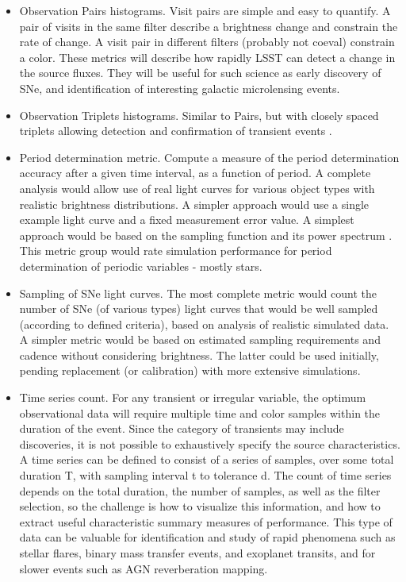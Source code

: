 \begin{itemize}

\item Observation Pairs histograms.  Visit pairs are simple and easy to
quantify.  A pair of visits in the same filter describe a brightness
change and constrain the rate of change. A visit pair in different
filters (probably not coeval) constrain a color.  These metrics will
describe how rapidly LSST can detect a change in the source fluxes. They
will be useful for such science as early discovery of SNe, and
identification of interesting galactic microlensing events.

\item Observation Triplets histograms. Similar to Pairs, but with
closely spaced triplets allowing detection and confirmation of transient
events \citep[as described by][]{LundEtal2016}.

\item Period determination metric.  Compute a measure of the period
determination accuracy after a given time interval, as a function of
period. A complete analysis would allow use of real light curves for
various object types with realistic brightness distributions.  A simpler
approach would use a single example light curve and a fixed measurement
error value. A simplest approach would be based on the sampling function
and its power spectrum \citep{LundEtal2016}.  This metric group would
rate simulation performance for period determination of periodic
variables - mostly stars.

\item Sampling of SNe light curves.  The most complete metric would
count the number of SNe (of various types) light curves that would be
well sampled (according to defined criteria), based on analysis of
realistic simulated data.  A simpler metric would be based on estimated
sampling requirements and cadence without considering brightness. The
latter could be used initially, pending replacement (or calibration)
with more extensive simulations.

\item Time series count. For any transient or irregular variable, the
optimum observational data will require multiple time and color samples
within the duration of the event. Since the category of transients may
include discoveries, it is not possible to exhaustively specify the
source characteristics. A time series can be defined to consist of a
series of samples, over some total duration T, with sampling interval t
to tolerance d. The count of time series depends on the total duration,
the number of samples, as well as the filter selection, so the challenge
is how to visualize this information, and how to extract useful
characteristic summary measures of performance.  This type of data can
be valuable for identification and study of rapid phenomena such as
stellar flares, binary mass transfer events, and exoplanet transits, and
for slower events such as AGN reverberation mapping.

\end{itemize}


\navigationbar

